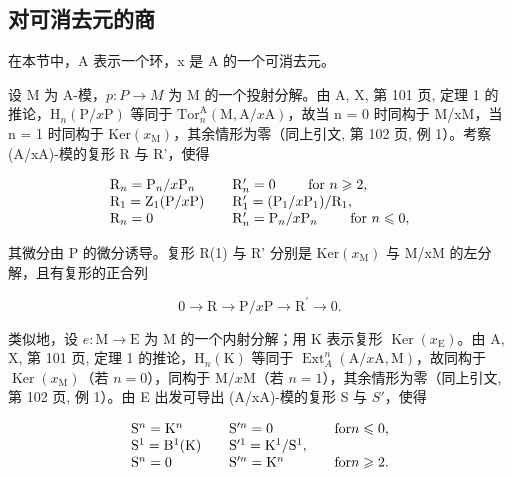 \subsection{对可消去元的商}

在本节中，A 表示一个环，x 是 A 的一个可消去元。

设 M 为 A-模，\(p: P \to M\) 为 M 的一个投射分解。由 A, X, 第 101 页, 定理 1 的推论，\(\mathrm{H}_{n}(\mathrm{P}/x\mathrm{P})\) 等同于 \(\mathrm{Tor}_{n}^{\mathrm{A}}(\mathrm{M}, \mathrm{A}/x\mathrm{A})\)，故当 n = 0 时同构于 M/xM，当 n = 1 时同构于 \(\mathrm{Ker}(x_{\mathrm{M}})\)，其余情形为零（同上引文, 第 102 页, 例 1）。考察 (A/xA)-模的复形 R 与 R'，使得

\[
\begin{array}{l l} \mathrm{R} _ {n} = \mathrm{P} _ {n} / x \mathrm{P} _ {n} & \quad \mathrm{R} _ {n} ^ {\prime} = 0 \qquad \text { for } n \geqslant 2, \\ \mathrm{R} _ {1} = \mathrm{Z} _ {1} (\mathrm{P} / x \mathrm{P}) & \quad \mathrm{R} _ {1} ^ {\prime} = (\mathrm{P} _ {1} / x \mathrm{P} _ {1}) / \mathrm{R} _ {1}, \\ \mathrm{R} _ {n} = 0 & \quad \mathrm{R} _ {n} ^ {\prime} = \mathrm{P} _ {n} / x \mathrm{P} _ {n} \qquad \text { for } n \leqslant 0, \end{array}
\]

其微分由 P 的微分诱导。复形 R(1) 与 R' 分别是 \(\mathrm{Ker}(x_{\mathrm{M}})\) 与 M/xM 的左分解，且有复形的正合列

\[
0 \rightarrow \mathrm{R} \longrightarrow \mathrm{P} / x \mathrm{P} \longrightarrow \mathrm{R} ^ {\prime} \longrightarrow 0.\tag{2}
\]

类似地，设 \(e: \mathrm{M} \to \mathrm{E}\) 为 M 的一个内射分解；用 K 表示复形 \(\operatorname{Ker}(x_{\mathrm{E}})\)。由 A, X, 第 101 页, 定理 1 的推论，\(\mathrm{H}_n(\mathrm{K})\) 等同于 \(\operatorname{Ext}_A^n (\mathrm{A} / x\mathrm{A},\mathrm{M})\)，故同构于 \(\operatorname{Ker}(x_{\mathrm{M}})\)（若 \(n = 0\)），同构于 \(\mathrm{M} / x\mathrm{M}\)（若 \(n = 1\)），其余情形为零（同上引文, 第 102 页, 例 1）。由 E 出发可导出 (A/xA)-模的复形 S 与 \(S'\)，使得

\[
\begin{array}{l l l} \mathrm{S} ^ {n} = \mathrm{K} ^ {n} & \quad \mathrm{S} ^ {\prime n} = 0 & \quad \text {for} n \leqslant 0, \\ \mathrm{S} ^ {1} = \mathrm{B} ^ {1} (\mathrm{K}) & \quad \mathrm{S} ^ {\prime 1} = \mathrm{K} ^ {1} / \mathrm{S} ^ {1}, \\ \mathrm{S} ^ {n} = 0 & \quad \mathrm{S} ^ {\prime n} = \mathrm{K} ^ {n} & \quad \text {for} n \geqslant 2. \end{array}
\]

